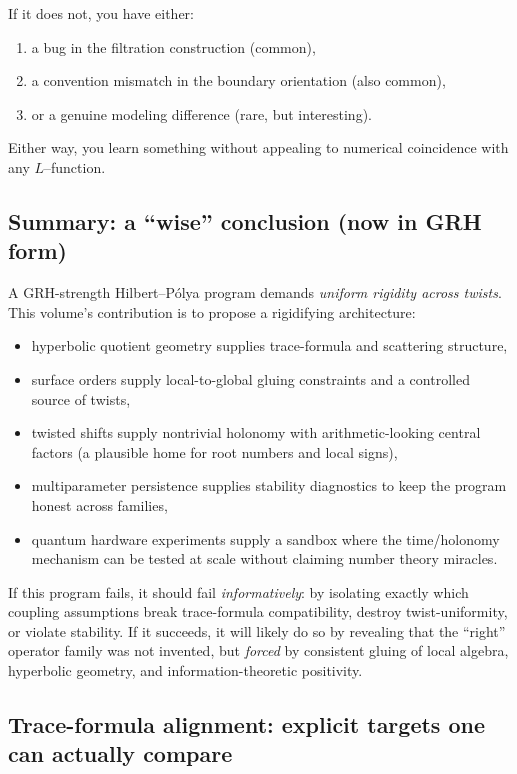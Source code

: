 \documentclass[11pt,oneside]{amsbook}
\numberwithin{equation}{section}
\theoremstyle{plain}
\theoremstyle{definition}
\theoremstyle{remark}
\begin{document}
If it does not, you have either:
\begin{enumerate}[label=(\roman*)]
\item a bug in the filtration construction (common),
\item a convention mismatch in the boundary orientation (also common),
\item or a genuine modeling difference (rare, but interesting).
\end{enumerate}
Either way, you learn something without appealing to numerical coincidence with any $L$--function.




\subsection{Summary: a ``wise'' conclusion (now in GRH form)}
\label{sec:HP_summary}

A GRH-strength Hilbert--Pólya program demands \emph{uniform rigidity across twists}.
This volume's contribution is to propose a rigidifying architecture:
\begin{itemize}
\item hyperbolic quotient geometry supplies trace-formula and scattering structure,
\item surface orders supply local-to-global gluing constraints and a controlled source of twists,
\item twisted shifts supply nontrivial holonomy with arithmetic-looking central factors (a plausible home for root numbers and local signs),
\item multiparameter persistence supplies stability diagnostics to keep the program honest across families,
\item quantum hardware experiments supply a sandbox where the time/holonomy mechanism can be tested at scale without claiming number theory miracles.
\end{itemize}

If this program fails, it should fail \emph{informatively}:
by isolating exactly which coupling assumptions break trace-formula compatibility, destroy twist-uniformity, or violate stability.
If it succeeds, it will likely do so by revealing that the ``right'' operator family was not invented, but \emph{forced} by consistent gluing of local algebra, hyperbolic geometry, and information-theoretic positivity.

\subsection{Trace-formula alignment: explicit targets one can actually compare}
\label{sec:trace_formula_targets}
\end{document}
